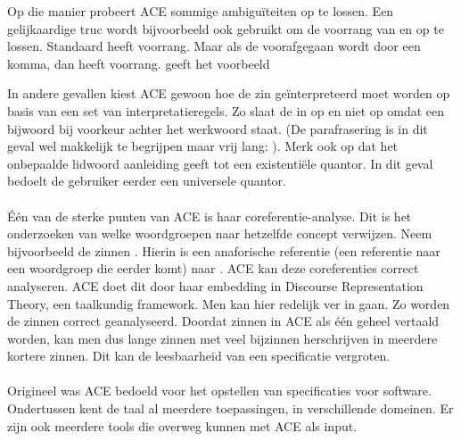 Op die manier probeert ACE sommige ambigu\"iteiten op te lossen. Een gelijkaardige truc wordt bijvoorbeeld ook gebruikt om de voorrang van  en  op te lossen. Standaard heeft  voorrang. Maar als de  voorafgegaan wordt door een komma, dan heeft  voorrang. \cite{ACEConstructionRules} geeft het voorbeeld 

In andere gevallen kiest ACE gewoon hoe de zin ge\"interpreteerd moet worden op basis van een set van interpretatieregels. Zo slaat de  in  \cite{ACEConstructionRules} op  en niet op  omdat een bijwoord bij voorkeur achter het werkwoord staat. (De parafrasering is in dit geval wel makkelijk te begrijpen maar vrij lang: ). Merk ook op dat het onbepaalde lidwoord aanleiding geeft tot een existenti\"ele quantor. In dit geval bedoelt de gebruiker eerder een universele quantor.

\paragraph{} \'E\'en van de sterke punten van ACE is haar coreferentie-analyse. Dit is het onderzoeken van welke woordgroepen naar hetzelfde concept verwijzen. Neem bijvoorbeeld de zinnen . Hierin is  een anaforische referentie (een referentie naar een woordgroep die eerder komt) naar . ACE kan deze coreferenties correct analyseren. ACE doet dit door haar embedding in Discourse Representation Theory, een taalkundig framework. Men kan hier redelijk ver in gaan. Zo worden de zinnen  correct geanalyseerd. Doordat zinnen in ACE als \'e\'en geheel vertaald worden, kan men dus lange zinnen met veel bijzinnen herschrijven in meerdere kortere zinnen. Dit kan de leesbaarheid van een specificatie vergroten.

\paragraph{} Origineel was ACE bedoeld voor het opstellen van specificaties voor software. Ondertussen kent de taal al meerdere toepassingen, in verschillende domeinen. Er zijn ook meerdere tools die overweg kunnen met ACE als input.

